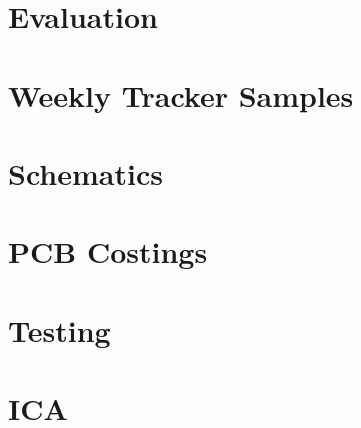 \documentclass[a4paper, 12pt]{report}
\begin{document}




\chapter{Evaluation}





\nocite{*}



\appendix
\chapter{Weekly Tracker Samples}

\chapter{Schematics}

\chapter{PCB Costings}

\chapter{Testing}

\chapter{ICA}

\end{document}
